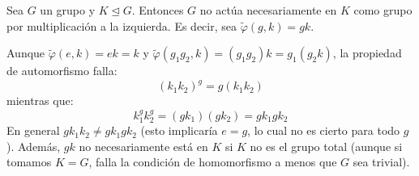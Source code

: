\begin{eje}
    Sea $G$ un grupo y $K \trianglelefteq G$. Entonces $G$ no actúa necesariamente en $K$ como grupo por multiplicación a la izquierda.
    Es decir, sea $\tilde{\varphi}(g, k) = gk$.
    
    Aunque $\tilde{\varphi}(e, k) = ek = k$ y $\tilde{\varphi}(g_1 g_2, k) = (g_1 g_2)k = g_1(g_2 k)$, la propiedad de automorfismo falla:
    \begin{equation*}
        (k_1 k_2)^g = g(k_1 k_2)
    \end{equation*}
    mientras que:
    \begin{equation*}
        k_1^g k_2^g = (g k_1)(g k_2) = g k_1 g k_2
    \end{equation*}
    En general $g k_1 k_2 \neq g k_1 g k_2$ (esto implicaría $e = g$, lo cual no es cierto para todo $g$).
    Además, $gk$ no necesariamente está en $K$ si $K$ no es el grupo total (aunque si tomamos $K=G$, falla la condición de homomorfismo a menos que $G$ sea trivial).
\end{eje}
